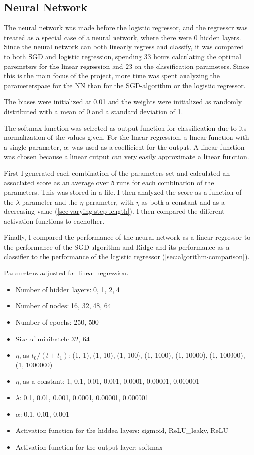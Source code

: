 \documentclass[a4paper, UKenglish]{article}
\newcommand{\0}{\mathbf{0}}
\newcommand{\1}{\mathbf{1}}
\begin{document}
\subsection{Neural Network} \label{sec:NN method}
The neural network was made before the logistic regressor, and the regressor was treated as a special case of a neural network, where there were 0 hidden layers. Since the neural network can both linearly regress and classify, it was compared to both SGD and logistic regression, spending 33 hours calculating the optimal paremeters for the linear regression and 23 on the classification parameters. Since this is the main focus of the project, more time was spent analyzing the parameterspace for the NN than for the SGD-algorithm or the logistic regressor.

The biases were initialized at 0.01 and the weights were initialized as randomly distributed with a mean of 0 and a standard deviation of 1.

The softmax function was selected as output function for classification due to its normalization of the values given. For the linear regression, a linear function with a single parameter, $\alpha$, was used as a coefficient for the output. A linear function was chosen because a linear output can very easily approximate a linear function.

First I generated each combination of the parameters set and calculated an associated score as an average over 5 runs for each combination of the parameters. This was stored in a file. I then analyzed the score as a function of the $\lambda$-parameter and the $\eta$-parameter, with $\eta$ as both a constant and as a decreasing value (\autoref{sec:varying step length}). I then compared the different activation functions to eachother.

Finally, I compared the performance of the neural network as a linear regressor to the performance of the SGD algorithm and Ridge and its performance as a classifier to the performance of the logistic regressor (\autoref{sec:algorithm-comparison}).

Parameters adjusted for linear regression:
\begin{itemize}
\item Number of hidden layers: 0, 1, 2, 4
\item Number of nodes: 16, 32, 48, 64
\item Number of epochs: 250, 500
\item Size of minibatch: 32, 64
\item $\eta$, as $t_0/(t+t_1)$: (1, 1), (1, 10), (1, 100), (1, 1000), (1, 10000),  (1, 100000), (1, 1000000)
\item $\eta$, as a constant: 1, 0.1, 0.01, 0.001, 0.0001, 0.00001, 0.000001
\item $\lambda$: 0.1, 0.01, 0.001, 0.0001, 0.00001, 0.000001
\item $\alpha$: 0.1, 0.01, 0.001
\item Activation function for the hidden layers: sigmoid, ReLU\_leaky, ReLU
\item Activation function for the output layer: softmax
\end{itemize}
\end{document}
